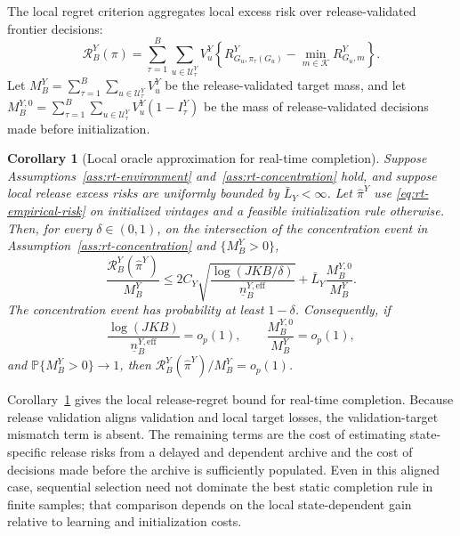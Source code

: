 \documentclass[a4paper, 12pt]{article}
\theoremstyle{plain}
\newtheorem{corollary}{Corollary}
\theoremstyle{remark}
\newcommand{\Prb}{\mathbb{P}}
\newcommand{\Kcal}{\mathcal{K}}
\newcommand{\Ucal}{\mathcal{U}}
\newcommand{\1}{\mathbf{1}}
\begin{document}
The local regret criterion aggregates local excess risk over release-validated frontier decisions:
\begin{equation}
\label{eq:rt-local-regret}
    \mathcal R^Y_B(\pi)
    =
    \sum_{\tau=1}^{B}
    \sum_{u\in\Ucal^Y_\tau}
    V^Y_u
    \left\{
        R^Y_{G_u,\pi_\tau(G_u)}-\min_{m\in\Kcal}R^Y_{G_u,m}
    \right\} .
\end{equation}
Let \(M^Y_B=\sum_{\tau=1}^{B}\sum_{u\in\Ucal^Y_\tau}V^Y_u\) be the release-validated target mass, and let \(M^{Y,0}_B=\sum_{\tau=1}^{B}\sum_{u\in\Ucal^Y_\tau}V^Y_u(1-I^Y_\tau)\) be the mass of release-validated decisions made before initialization.

\begin{corollary}[Local oracle approximation for real-time completion]
\label{cor:rt-local-regret}
Suppose Assumptions~\ref{ass:rt-environment} and~\ref{ass:rt-concentration} hold, and suppose local release excess risks are uniformly bounded by \(\bar L_Y<\infty\). Let \(\widehat\pi^{Y}\) use \eqref{eq:rt-empirical-risk} on initialized vintages and a feasible initialization rule otherwise. Then, for every \(\delta\in(0,1)\), on the intersection of the concentration event in Assumption~\ref{ass:rt-concentration} and \(\{M^Y_B>0\}\),
\begin{equation}
\label{eq:rt-local-regret-bound}
    \frac{\mathcal R^Y_B(\widehat\pi^Y)}{M^Y_B}
    \leq
    2C_Y
    \sqrt{\frac{\log(JKB/\delta)}{\underline n^{Y,\mathrm{eff}}_B}}
    +
    \bar L_Y\frac{M^{Y,0}_B}{M^Y_B} .
\end{equation}
The concentration event has probability at least \(1-\delta\). Consequently, if
\begin{equation*}
    \frac{\log(JKB)}{\underline n^{Y,\mathrm{eff}}_B}=o_p(1),
    \qquad
    \frac{M^{Y,0}_B}{M^Y_B}=o_p(1),
\end{equation*}
and \(\Prb\{M^Y_B>0\}\to1\), then \(\mathcal R^Y_B(\widehat\pi^Y)/M^Y_B=o_p(1)\).
\end{corollary}

Corollary~\ref{cor:rt-local-regret} gives the local release-regret bound for real-time completion. Because release validation aligns validation and local target losses, the validation-target mismatch term is absent. The remaining terms are the cost of estimating state-specific release risks from a delayed and dependent archive and the cost of decisions made before the archive is sufficiently populated. Even in this aligned case, sequential selection need not dominate the best static completion rule in finite samples; that comparison depends on the local state-dependent gain relative to learning and initialization costs.
\end{document}
